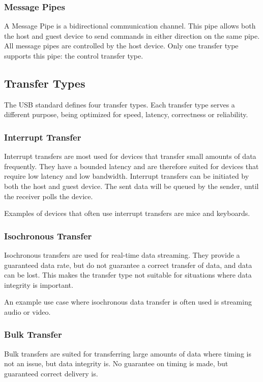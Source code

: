 \subsubsection{Message Pipes}
A Message Pipe is a bidirectional communication channel. This pipe allows both the host and guest device to send commands in either direction on the same pipe. All message pipes are controlled by the host device. Only one transfer type supports this pipe: the control transfer type.

\subsection{Transfer Types}
\label{section:transfer_types}
The USB standard defines four transfer types. Each transfer type serves a different purpose, being optimized for speed, latency, correctness or reliability.

\subsubsection{Interrupt Transfer}
Interrupt transfers are most used for devices that transfer small amounts of data frequently. They have a bounded latency and are therefore suited for devices that require low latency and low bandwidth. Interrupt transfers can be initiated by both the host and guest device. The sent data will be queued by the sender, until the receiver polls the device.

Examples of devices that often use interrupt transfers are mice and keyboards.

\subsubsection{Isochronous Transfer}
Isochronous transfers are used for real-time data streaming. They provide a guaranteed data rate, but do not guarantee a correct transfer of data, and data can be lost. This makes the transfer type not suitable for situations where data integrity is important.

An example use case where isochronous data transfer is often used is streaming audio or video.

\subsubsection{Bulk Transfer}
Bulk transfers are suited for transferring large amounts of data where timing is not an issue, but data integrity is. No guarantee on timing is made, but guaranteed correct delivery is.

